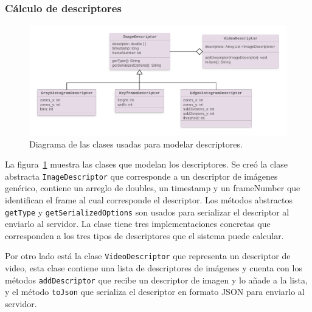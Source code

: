 \subsubsection*{Cálculo de descriptores}
	\begin{figure}[!h]
		\centering
		\includegraphics[scale=1.6]{imagenes/cap4/diagrama_clases_descriptores.png}
		\caption{Diagrama de las clases usadas para modelar descriptores.}
		\label{diagrama_clases_descriptores}
	\end{figure}
La figura~\ref{diagrama_clases_descriptores} muestra las clases que modelan los descriptores. Se creó la clase abstracta \texttt{ImageDescriptor} que corresponde a un descriptor de imágenes genérico, contiene un arreglo de doubles, un timestamp y un frameNumber que identifican el frame al cual corresponde el descriptor. Los métodos abstractos \texttt{getType} y \texttt{getSerializedOptions} son usados para serializar el descriptor al enviarlo al servidor. La clase tiene tres implementaciones concretas que corresponden a los tres tipos de descriptores que el sistema puede calcular.

Por otro lado está la clase \texttt{VideoDescriptor} que representa un descriptor de video, esta clase contiene una lista de descriptores de imágenes y cuenta con los métodos \texttt{addDescriptor} que recibe un descriptor de imagen y lo añade a la lista, y el método \texttt{toJson} que serializa el descriptor en formato JSON para enviarlo al servidor.


